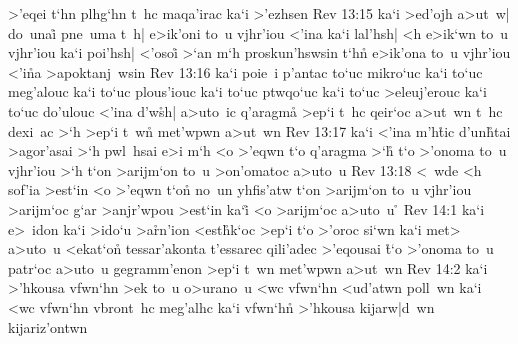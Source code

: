 >'eqei
t`hn
plhg`hn
t~hc
maqa'irac
ka`i
>'ezhsen\bibvsend
\vs Rev 13:15
ka`i
>ed'ojh
a>ut~w|
do~unai\r{}
pne~uma
t~h|
e>ik'oni
to~u
vjhr'iou
<'ina
ka`i
lal'hsh|
<h
e>ik`wn
to~u
vjhr'iou
ka`i
poi'hsh|
<'osoi\r{}
>`an
m`h
proskun'hswsin
t`hn\r{}
e>ik'ona
to~u
vjhr'iou
<'i\r{n}a
>apoktanj~wsin\bibvsend
\vs Rev 13:16
ka`i
poie~i
p'antac
to`uc
mikro`uc
ka`i
to`uc
meg'alouc
ka`i
to`uc
plous'iouc
ka`i
to`uc
ptwqo`uc
ka`i
to`uc
>eleuj'erouc
ka`i
to`uc
do'ulouc
<'ina
d'w\r{s}h|
a>uto~ic
q'aragm\r{a}
>ep`i
t~hc
qeir`oc
a>ut~wn
t~hc
dexi~ac
>`h
>ep`i
t~wn\r{}
met'wpwn
a>ut~wn\bibvsend
\vs Rev 13:17
ka`i
<'ina
m'h\r{t}ic
d'un\r{h}tai
>agor'asai
>`h
pwl~hsai
e>i
m`h
<o
>'eqwn
t`o
q'aragma
>`h\r{}
t`o
>'onoma
to~u
vjhr'iou
>`h
t`on
>arijm`on
to~u
>on'omatoc
a>uto~u\bibvsend
\vs Rev 13:18
<~wde
<h
sof'ia
>est`in
<o
>'eqwn
t`on\r{}
no~un
yhfis'atw
t`on
>arijm`on
to~u
vjhr'iou
>arijm`oc
g`ar
>anjr'wpou
>est`in
ka`i\r{}
<o
>arijm`oc
a>uto~u
\qxc\r{}\bibvsend
{}
\vs Rev 14:1
ka`i
e>~idon
ka`i
>ido`u
>a\r{r}n'ion
<est\r{h}k`oc
>ep`i
t`o
>'oroc
si`wn
ka`i
met>
a>uto~u
<ekat`on\r{}
tessar'akonta
t'essarec
qili'adec
>'eqousai
\r{t}`o
>'onoma
to~u
patr`oc
a>uto~u
gegramm'enon
>ep`i
t~wn
met'wpwn
a>ut~wn\bibvsend
\vs Rev 14:2
ka`i
>'hkousa
vfwn`hn
>ek
to~u
o>urano~u
<wc
vfwn`hn
<ud'atwn
poll~wn
ka`i
<wc
vfwn`hn
vbront~hc
meg'alhc
ka`i
vfwn`hn\r{}
>'hkousa
kijarw|d~wn
kijariz'ontwn
